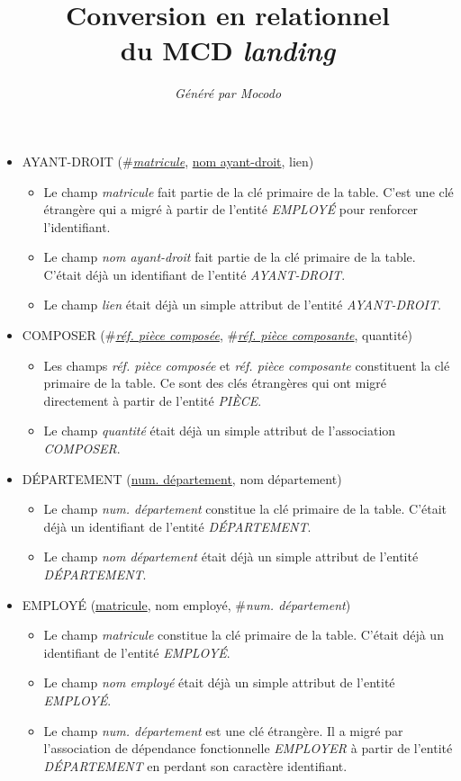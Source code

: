 \documentclass[a4paper]{article}
\title{Conversion en relationnel\\du MCD \emph{landing}}
\author{\emph{Généré par Mocodo}}
\newcommand{\relat}[1]{\textsc{#1}}
\newcommand{\attr}[1]{#1}
\newcommand{\prim}[1]{\uline{#1}}
\newcommand{\foreign}[1]{\#\textsl{#1}}
\begin{document}
\maketitle

\begin{itemize}
  \item \relat{AYANT-DROIT} (\foreign{\prim{matricule}}, \prim{nom ayant-droit}, \attr{lien})
  \begin{itemize}
    \item Le champ \emph{matricule} fait partie de la clé primaire de la table. C'est une clé étrangère qui a migré à partir de l'entité \emph{EMPLOYÉ} pour renforcer l'identifiant.
    \item Le champ \emph{nom ayant-droit} fait partie de la clé primaire de la table. C'était déjà un identifiant de l'entité \emph{AYANT-DROIT}.
    \item Le champ \emph{lien} était déjà un simple attribut de l'entité \emph{AYANT-DROIT}.
  \end{itemize}

  \item \relat{COMPOSER} (\foreign{\prim{réf. pièce composée}}, \foreign{\prim{réf. pièce composante}}, \attr{quantité})
  \begin{itemize}
    \item Les champs \emph{réf. pièce composée} et \emph{réf. pièce composante} constituent la clé primaire de la table. Ce sont des clés étrangères qui ont migré directement à partir de l'entité \emph{PIÈCE}.
    \item Le champ \emph{quantité} était déjà un simple attribut de l'association \emph{COMPOSER}.
  \end{itemize}

  \item \relat{DÉPARTEMENT} (\prim{num. département}, \attr{nom département})
  \begin{itemize}
    \item Le champ \emph{num. département} constitue la clé primaire de la table. C'était déjà un identifiant de l'entité \emph{DÉPARTEMENT}.
    \item Le champ \emph{nom département} était déjà un simple attribut de l'entité \emph{DÉPARTEMENT}.
  \end{itemize}

  \item \relat{EMPLOYÉ} (\prim{matricule}, \attr{nom employé}, \foreign{num. département})
  \begin{itemize}
    \item Le champ \emph{matricule} constitue la clé primaire de la table. C'était déjà un identifiant de l'entité \emph{EMPLOYÉ}.
    \item Le champ \emph{nom employé} était déjà un simple attribut de l'entité \emph{EMPLOYÉ}.
    \item Le champ \emph{num. département} est une clé étrangère. Il a migré par l'association de dépendance fonctionnelle \emph{EMPLOYER} à partir de l'entité \emph{DÉPARTEMENT} en perdant son caractère identifiant.
  \end{itemize}


\end{itemize}
\end{document}
